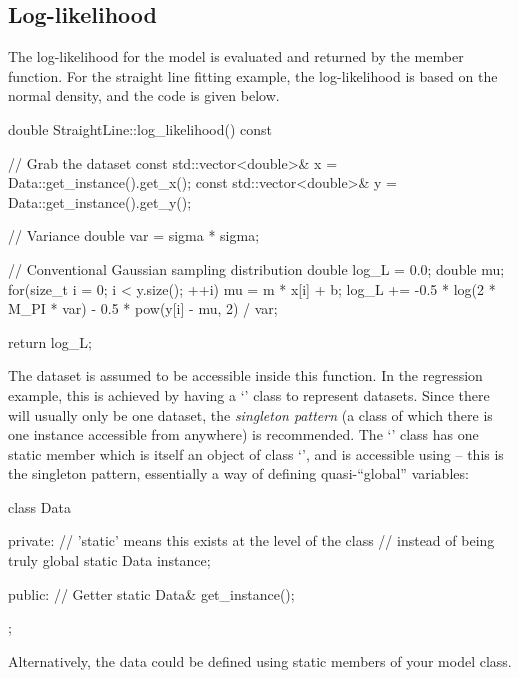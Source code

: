 \documentclass[article]{jss}
\begin{document}
\subsection{Log-likelihood}
The log-likelihood for the model is evaluated and returned by the
 member function. For the straight line
fitting example, the log-likelihood is based on the
normal density, and the code is given below.
%
\begin{CodeChunk}
\begin{CodeInput}
double StraightLine::log_likelihood() const
{
    // Grab the dataset
    const std::vector<double>& x = Data::get_instance().get_x();
    const std::vector<double>& y = Data::get_instance().get_y();

    // Variance
    double var = sigma * sigma;

    // Conventional Gaussian sampling distribution
    double log_L = 0.0;
    double mu;
    for(size_t i = 0; i < y.size(); ++i)
    {
        mu = m * x[i] + b;
        log_L += -0.5 * log(2 * M_PI * var) - 0.5 * pow(y[i] - mu, 2) / var;
    }

    return log_L;
}
\end{CodeInput}
\end{CodeChunk}
%
The dataset is assumed to be accessible inside this function. In the
regression example, this is achieved by having a
`' class to represent
datasets. Since there will usually only be one dataset,
the {\em singleton pattern} (a class of which there is one instance
accessible from anywhere) is recommended.
The `' class has
one static member which is itself an object of class `', and is
accessible using  -- this is the singleton pattern,
essentially a way of defining quasi-``global'' variables:
%
\begin{CodeChunk}
\begin{CodeInput}
class Data
{
    private:
        // 'static' means this exists at the level of the class
        // instead of being truly global
        static Data instance;

    public:
        // Getter
        static Data& get_instance();
};
\end{CodeInput}
\end{CodeChunk}
%
Alternatively, the data could be defined using static members of your
model class.
\end{document}
